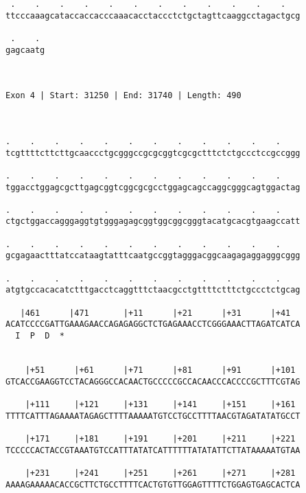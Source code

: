 \documentclass{article}
\begin{document}
\begin{Verbatim}
 .    .    .    .    .    .    .    .    .    .    .    .   
ttcccaaagcataccaccacccaaacacctaccctctgctagttcaaggcctagactgcg
                                                            
 .    . 
gagcaatg
        
        
 
Exon 4 | Start: 31250 | End: 31740 | Length: 490



.    .    .    .    .    .    .    .    .    .    .    .    
tcgttttcttcttgcaaccctgcgggccgcgcggtcgcgctttctctgccctccgccggg
                                                            
.    .    .    .    .    .    .    .    .    .    .    .    
tggacctggagcgcttgagcggtcggcgcgcctggagcagccaggcgggcagtggactag
                                                            
.    .    .    .    .    .    .    .    .    .    .    .    
ctgctggaccagggaggtgtgggagagcggtggcggcgggtacatgcacgtgaagccatt
                                                            
.    .    .    .    .    .    .    .    .    .    .    .    
gcgagaactttatccataagtatttcaatgccggtagggacggcaagagaggagggcggg
                                                            
.    .    .    .    .    .    .    .    .    .    .    .    
atgtgccacacatctttgacctcaggtttctaacgcctgttttctttctgccctctgcag
                                                            
   |461      |471       |+11      |+21      |+31      |+41  
ACATCCCCGATTGAAAGAACCAGAGAGGCTCTGAGAAACCTCGGGAAACTTAGATCATCA
  I  P  D  *   
                                                            
  
    |+51      |+61      |+71      |+81      |+91      |+101 
GTCACCGAAGGTCCTACAGGGCCACAACTGCCCCCGCCACAACCCACCCCGCTTTCGTAG
                                                            
    |+111     |+121     |+131     |+141     |+151     |+161 
TTTTCATTTAGAAAATAGAGCTTTTAAAAATGTCCTGCCTTTTAACGTAGATATATGCCT
                                                            
    |+171     |+181     |+191     |+201     |+211     |+221 
TCCCCCACTACCGTAAATGTCCATTTATATCATTTTTTATATATTCTTATAAAAATGTAA
                                                            
    |+231     |+241     |+251     |+261     |+271     |+281 
AAAAGAAAAACACCGCTTCTGCCTTTTCACTGTGTTGGAGTTTTCTGGAGTGAGCACTCA
                                                            

\end{Verbatim}
\end{document}
